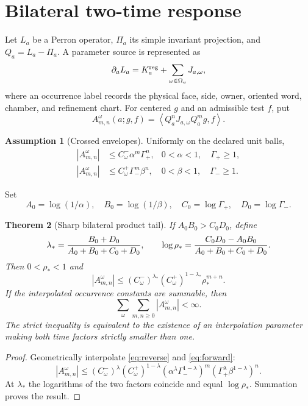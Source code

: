 \documentclass[11pt,reqno]{amsart}
\newtheorem{theorem}{Theorem}[section]
\theoremstyle{definition}
\newtheorem{assumption}[theorem]{Assumption}
\theoremstyle{remark}
\newcommand{\abs}[1]{\left\lvert #1\right\rvert}
\newcommand{\pair}[2]{\left\langle #1,#2\right\rangle}
\begin{document}
\section{Bilateral two-time response}\label{sec:bilateral}
Let $L_a$ be a Perron operator, $\Pi_a$ its simple invariant projection, and
$Q_a=L_a-\Pi_a$.  A parameter source is represented as
\[
 \partial_aL_a=K_a^{\rm reg}+\sum_{\omega\in\Omega_a}J_{a,\omega},
\]
where an occurrence label records the physical face, side, owner, oriented
word, chamber, and refinement chart.  For centered $g$ and an admissible test
$f$, put
\[
 A_{m,n}^{\omega}(a;g,f)=
 \pair{Q_a^nJ_{a,\omega}Q_a^m g}{f}.
\]

\begin{assumption}[Crossed envelopes]\label{ass:crossed}
Uniformly on the declared unit balls,
\begin{align}
 \abs{A_{m,n}^{\omega}}
 &\le C_\omega^-\alpha^m\Gamma_+^n,
 &0<\alpha<1,\quad\Gamma_+\ge1,\label{eq:reverse}\\
 \abs{A_{m,n}^{\omega}}
 &\le C_\omega^+\Gamma_-^m\beta^n,
 &0<\beta<1,\quad\Gamma_-\ge1.\label{eq:forward}
\end{align}
\end{assumption}
Set
\[
 A_0=\log(1/\alpha),\quad B_0=\log(1/\beta),\quad
 C_0=\log\Gamma_+,\quad D_0=\log\Gamma_-.
\]

\begin{theorem}[Sharp bilateral product tail]\label{thm:bilateral}
If $A_0B_0>C_0D_0$, define
\[
 \lambda_*={B_0+D_0\over A_0+B_0+C_0+D_0},
 \qquad
 \log\rho_*={C_0D_0-A_0B_0\over A_0+B_0+C_0+D_0}.
\]
Then $0<\rho_*<1$ and
\[
 \abs{A_{m,n}^{\omega}}
 \le(C_\omega^-)^{\lambda_*}(C_\omega^+)^{1-\lambda_*}
 \rho_*^{m+n}.
\]
If the interpolated occurrence constants are summable, then
\[
 \sum_\omega\sum_{m,n\ge0}\abs{A_{m,n}^{\omega}}<\infty.
\]
The strict inequality is equivalent to the existence of an interpolation
parameter making both time factors strictly smaller than one.
\end{theorem}

\begin{proof}
Geometrically interpolate \eqref{eq:reverse} and \eqref{eq:forward}:
\[
 \abs{A_{m,n}^{\omega}}
 \le(C_\omega^-)^\lambda(C_\omega^+)^{1-\lambda}
 (\alpha^\lambda\Gamma_-^{1-\lambda})^m
 (\Gamma_+^\lambda\beta^{1-\lambda})^n.
\]
At $\lambda_*$ the logarithms of the two factors coincide and equal
$\log\rho_*$.  Summation proves the result.
\end{proof}
\end{document}
